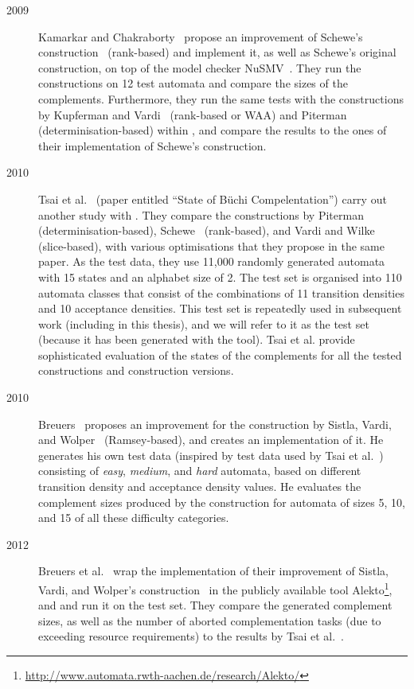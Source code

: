 {\begin{description}
\item[2009] Kamarkar and Chakraborty~\cite{2009_karmarkar} propose an improvement of Schewe's construction~\cite{schewe2009buchi} (rank-based) and implement it, as well as Schewe's original construction, on top of the model checker NuSMV~\cite{1999_nusmv,2002_nusmv}. They run the constructions on 12 test automata and compare the sizes of the complements. Furthermore, they run the same tests with the constructions by  Kupferman and Vardi~\cite{Kupferman:2001} (rank-based or WAA) and Piterman~\cite{2007_piterman} (determinisation-based) within \goal, and compare the results to the ones of their implementation of Schewe's construction.

\item[2010] Tsai et al.~\cite{2011_tsai} (paper entitled ``State of Büchi Compelentation'') carry out another study with \goal. They compare the constructions by Piterman~\cite{2007_piterman} (determinisation-based), Schewe~\cite{schewe2009buchi} (rank-based), and Vardi and Wilke~\cite{vardi2007automata} (slice-based), with various optimisations that they propose in the same paper. As the test data, they use 11,000 randomly generated automata with 15 states and an alphabet size of 2. The test set is organised into 110 automata classes that consist of the combinations of 11 transition densities and 10 acceptance densities. This test set is repeatedly used in subsequent work (including in this thesis), and we will refer to it as the \goal{} test set (because it has been generated with the \goal{} tool). Tsai et al. provide sophisticated evaluation of the states of the complements for all the tested constructions and construction versions.

\item[2010] Breuers~\cite{2010_breuers_bsc} proposes an improvement for the construction by Sistla, Vardi, and Wolper~\cite{PrasadSistla1987217} (Ramsey-based), and creates an implementation of it. He generates his own test data (inspired by test data used by Tsai et al.~\cite{2011_tsai}) consisting of \textit{easy}, \textit{medium}, and \textit{hard} automata, based on different transition density and acceptance density values. He evaluates the complement sizes produced by the construction for automata of sizes 5, 10, and 15 of all these difficulty categories.

\item[2012] Breuers et al.~\cite{2012_breuers} wrap the implementation of their improvement of Sistla, Vardi, and Wolper's construction~\cite{PrasadSistla1987217} in the publicly available tool Alekto\footnote{\url{http://www.automata.rwth-aachen.de/research/Alekto/}}, and and run it on the \goal{} test set. They compare the generated complement sizes, as well as the number of aborted complementation tasks (due to exceeding resource requirements) to the results by Tsai et al.~\cite{2011_tsai}.


\end{description}}

